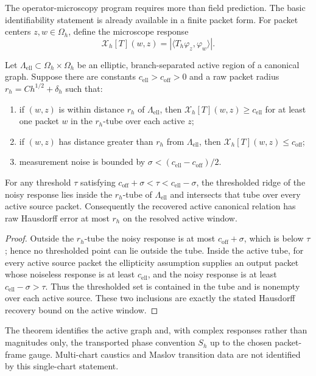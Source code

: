 The operator-microscopy program requires more than field prediction.  The
basic identifiability statement is already available in a finite packet form.
For packet centers $z,w\in\Omega_h$, define the microscope response
\[
  \mathcal X_h[T](w,z)=|\langle T_h\varphi_z,\varphi_w\rangle|.
\]

\begin{theorem}
\label{thm:packet-microscope-identifiability}
Let $\Lambda_{\mathrm{ell}}\subset\Omega_h\times\Omega_h$ be an elliptic,
branch-separated active region of a canonical graph.  Suppose there are
constants $c_{\mathrm{ell}}>c_{\mathrm{off}}>0$ and a raw packet radius
$r_h=C h^{1/2}+\delta_h$ such that:
\begin{enumerate}
\item if $(w,z)$ is within distance $r_h$ of $\Lambda_{\mathrm{ell}}$, then
      $\mathcal X_h[T](w,z)\ge c_{\mathrm{ell}}$ for at least one packet
      $w$ in the $r_h$-tube over each active $z$;
\item if $(w,z)$ has distance greater than $r_h$ from $\Lambda_{\mathrm{ell}}$,
      then $\mathcal X_h[T](w,z)\le c_{\mathrm{off}}$;
\item measurement noise is bounded by $\sigma<(c_{\mathrm{ell}}-c_{\mathrm{off}})/2$.
\end{enumerate}
For any threshold $\tau$ satisfying
$c_{\mathrm{off}}+\sigma<\tau<c_{\mathrm{ell}}-\sigma$, the thresholded ridge
of the noisy response lies inside the $r_h$-tube of
$\Lambda_{\mathrm{ell}}$ and intersects that tube over every active source
packet.  Consequently the recovered active canonical relation has raw
Hausdorff error at most $r_h$ on the resolved active window.
\end{theorem}

\begin{proof}
Outside the $r_h$-tube the noisy response is at most $c_{\mathrm{off}}+\sigma$,
which is below $\tau$; hence no thresholded point can lie outside the tube.
Inside the active tube, for every active source packet the ellipticity
assumption supplies an output packet whose noiseless response is at least
$c_{\mathrm{ell}}$, and the noisy response is at least
$c_{\mathrm{ell}}-\sigma>\tau$.  Thus the thresholded set is contained in the
tube and is nonempty over each active source.  These two inclusions are exactly
the stated Hausdorff recovery bound on the active window.
\end{proof}

The theorem identifies the active graph and, with complex responses rather
than magnitudes only, the transported phase convention $S_h$ up to the chosen
packet-frame gauge.  Multi-chart caustics and Maslov transition data are not
identified by this single-chart statement.

